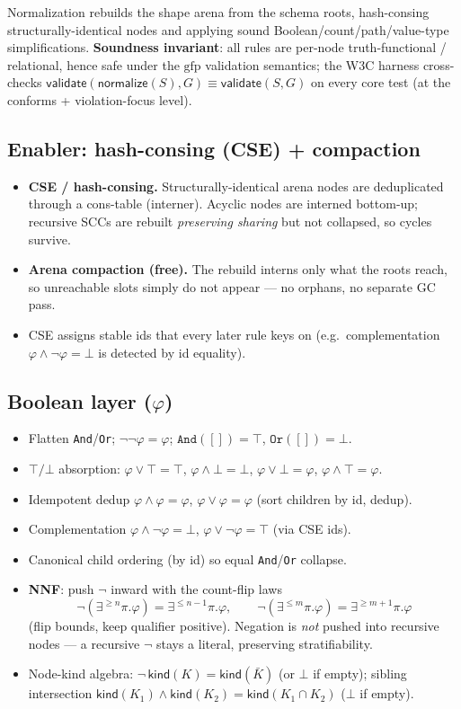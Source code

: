 \documentclass[11pt]{article}
\newcommand{\kind}{\mathsf{kind}}
\newcommand{\gfp}{\mathrm{gfp}}
\newcommand{\code}[1]{\texttt{#1}}
\theoremstyle{definition}
\begin{document}
Normalization rebuilds the shape arena from the schema roots, hash-consing
structurally-identical nodes and applying sound Boolean/count/path/value-type
simplifications. \textbf{Soundness invariant}: all rules are per-node
truth-functional / relational, hence safe under the $\gfp$ validation semantics;
the W3C harness cross-checks
$\mathsf{validate}(\mathsf{normalize}(S),G)\equiv\mathsf{validate}(S,G)$ on every
core test (at the conforms + violation-focus level).

\subsection{Enabler: hash-consing (CSE) + compaction}
\begin{itemize}[leftmargin=1.4em]
  \item \textbf{CSE / hash-consing.} Structurally-identical arena nodes are
  deduplicated through a cons-table (interner). Acyclic nodes are interned
  bottom-up; recursive SCCs are rebuilt \emph{preserving sharing} but not
  collapsed, so cycles survive.
  \item \textbf{Arena compaction (free).} The rebuild interns only what the roots
  reach, so unreachable slots simply do not appear --- no orphans, no separate GC
  pass.
  \item CSE assigns stable ids that every later rule keys on (e.g.\
  complementation $\varphi\wedge\neg\varphi=\bot$ is detected by id equality).
\end{itemize}

\subsection{Boolean layer ($\varphi$)}
\begin{itemize}[leftmargin=1.4em]
  \item Flatten \code{And}/\code{Or}; $\neg\neg\varphi=\varphi$;
  $\code{And}([])=\top$, $\code{Or}([])=\bot$.
  \item $\top/\bot$ absorption: $\varphi\vee\top=\top$, $\varphi\wedge\bot=\bot$,
  $\varphi\vee\bot=\varphi$, $\varphi\wedge\top=\varphi$.
  \item Idempotent dedup $\varphi\wedge\varphi=\varphi$,
  $\varphi\vee\varphi=\varphi$ (sort children by id, dedup).
  \item Complementation $\varphi\wedge\neg\varphi=\bot$,
  $\varphi\vee\neg\varphi=\top$ (via CSE ids).
  \item Canonical child ordering (by id) so equal \code{And}/\code{Or} collapse.
  \item \textbf{NNF}: push $\neg$ inward with the count-flip laws
  \[
  \neg(\exists^{\geq n}\pi.\varphi)=\exists^{\leq n-1}\pi.\varphi,\qquad
  \neg(\exists^{\leq m}\pi.\varphi)=\exists^{\geq m+1}\pi.\varphi
  \]
  (flip bounds, keep qualifier positive). Negation is \emph{not} pushed into
  recursive nodes --- a recursive $\neg$ stays a literal, preserving
  stratifiability.
  \item Node-kind algebra: $\neg\,\kind(K)=\kind(\bar K)$ (or $\bot$ if empty);
  sibling intersection $\kind(K_1)\wedge\kind(K_2)=\kind(K_1\cap K_2)$ ($\bot$ if
  empty).
\end{itemize}
\end{document}
